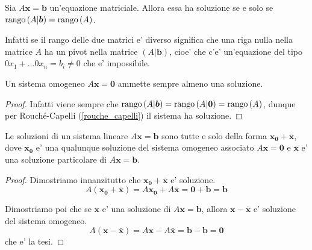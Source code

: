 \begin{theorem} \label{rouche_capelli}
    Sia $A\bm{x} = \bm b$ un'equazione matriciale. Allora essa ha soluzione se e solo se $\operatorname{rango}\left( A|\bm b \right) = \operatorname{rango}\left( A \right)$.
\end{theorem}
\begin{intuition}
    Infatti se il rango delle due matrici e' diverso significa che una riga nulla nella matrice $A$ ha un pivot nella matrice $(A|\bm b)$, cioe' che c'e' un'equazione del tipo $0x_1 + \dots 0x_n = b_i \neq 0$ che e' impossibile.
\end{intuition}

\begin{proposition}
    Un sistema omogeneo $A\bm{x} = \bm 0$ ammette sempre almeno una soluzione.
\end{proposition}
\begin{proof}
    Infatti viene sempre che $\operatorname{rango}\left( A|\bm b \right) = \operatorname{rango}\left( A|\bm 0 \right) = \operatorname{rango}\left( A \right)$, dunque per Rouché-Capelli (\ref{rouche_capelli}) il sistema ha soluzione.
\end{proof}

\begin{proposition}
    Le soluzioni di un sistema lineare $A\bm x = \bm b$ sono tutte e solo della forma $\bm{x_0} + \bm{\bar{x}}$, dove $\bm{x_0}$ e' una qualunque soluzione del sistema omogeneo associato $A\bm x = \bm 0$ e $\bm{\bar{x}}$ e' una soluzione particolare di $A\bm x = \bm b$.
\end{proposition}
\begin{proof}
    Dimostriamo innanzitutto che $\bm{x_0} + \bm{\bar{x}}$ e' soluzione.
    \[A(\bm{x_0} + \bm{\bar{x}}) = A\bm{x_0} + A\bm{\bar{x}} = \bm 0 + \bm b = \bm b\]

    Dimostriamo poi che se $\bm x$ e' una soluzione di $A\bm x = \bm b$, allora $\bm x - \bm{\bar x}$ e' soluzione del sistema omogeneo.
    \[A(\bm{x} - \bm{\bar{x}}) = A\bm{x} - A\bm{\bar{x}} = \bm b - \bm b = \bm 0\]
    che e' la tesi.
\end{proof}

